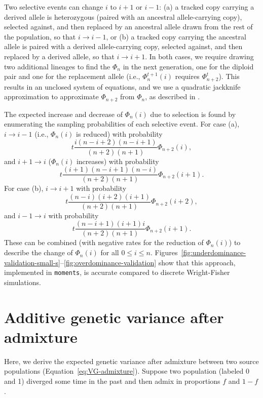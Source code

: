 \documentclass{article}
\newcommand{\moments}{\texttt{moments}\xspace}
\begin{document}
Two selective events can change $i$ to $i+1$ or $i-1$: (a) a tracked copy
carrying a derived allele is heterozygous (paired with an ancestral
allele-carrying copy), selected against, and then replaced by an ancestral
allele drawn from the rest of the population, so that \(i\rightarrow i-1\), or
(b) a tracked copy carrying the ancestral allele is paired with a derived
allele-carrying copy, selected against, and then replaced by a derived allele,
so that \(i\rightarrow i+1\). In both cases, we require drawing two additional
lineages to find the \(\Phi_n\) in the next generation, one for the diploid
pair and one for the replacement allele (i.e., \(\Phi_n^{t+1}(i)\) requires
\(\Phi_{n+2}^t\)). This results in an unclosed system of equations, and we use
a quadratic jackknife approximation to approximate \(\Phi_{n+2}\) from
\(\Phi_n\), as described in \citet{jouganous2017inferring}.

The expected increase and decrease of $\Phi_n(i)$ due to selection is found by
enumerating the sampling probabilities of each selective event. For case (a),
\(i\rightarrow i-1\) (i.e., \(\Phi_n(i)\) is reduced) with probability
\[t\frac{i(n-i+2)(n-i+1)}{(n+2)(n+1)}\Phi_{n+2}(i),\] and \(i+1\rightarrow i\)
(\(\Phi_n(i)\) increases) with probability
\[t\frac{(i+1)(n-i+1)(n-i)}{(n+2)(n+1)}\Phi_{n+2}(i+1).\] For case (b),
\(i\rightarrow i+1\) with probability
\[t\frac{(n-i)(i+2)(i+1)}{(n+2)(n+1)}\Phi_{n+2}(i+2),\] and \(i-1 \rightarrow
i\) with probability \[t\frac{(n-i+1)(i+1)i}{(n+2)(n+1)}\Phi_{n+2}(i+1).\]
These can be combined (with negative rates for the reduction of \(\Phi_n(i)\))
to describe the change of \(\Phi_n(i)\) for all \(0\leq i \leq n\).
Figures~\ref{fig:underdominance-validation-small-s}--\ref{fig:overdominance-validation}
show that this approach, implemented in \moments, is accurate compared to
discrete Wright-Fisher simulations.

\section{Additive genetic variance after admixture}\label{sec:VG-admixture}

Here, we derive the expected genetic variance after admixture between two
source populations (Equation~\ref{eq:VG-admixture}). Suppose two population
(labeled 0 and 1) diverged some time in the past and then admix in proportions
$f$ and $1-f$.
\end{document}

